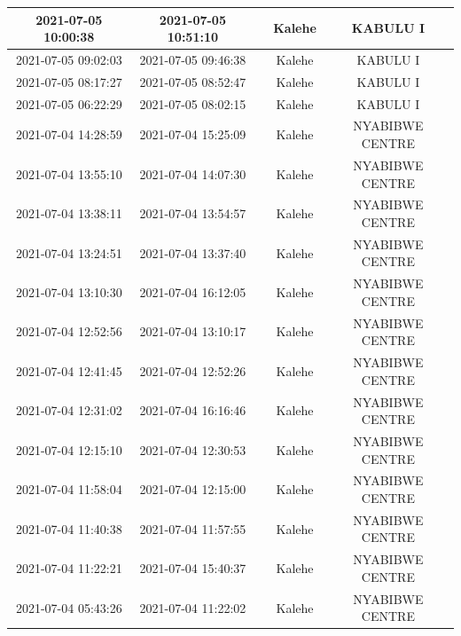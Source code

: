 \documentclass[
]{book}
\begin{document}
\begin{table}
\begin{tabular}[t]{c|c|>{}c|c|c}
\hline
2021-07-05 10:00:38 & 2021-07-05 10:51:10 & \cellcolor[HTML]{3C508B}{\textcolor{white}{51}} & Kalehe & KABULU I\\
\hline
2021-07-05 09:02:03 & 2021-07-05 09:46:38 & \cellcolor[HTML]{43BF71}{\textcolor{white}{45}} & Kalehe & KABULU I\\
\hline
2021-07-05 08:17:27 & 2021-07-05 08:52:47 & \cellcolor[HTML]{306B8E}{\textcolor{white}{35}} & Kalehe & KABULU I\\
\hline
2021-07-05 06:22:29 & 2021-07-05 08:02:15 & \cellcolor[HTML]{3A558C}{\textcolor{white}{100}} & Kalehe & KABULU I\\
\hline
2021-07-04 14:28:59 & 2021-07-04 15:25:09 & \cellcolor[HTML]{3BBB75}{\textcolor{white}{56}} & Kalehe & NYABIBWE CENTRE\\
\hline
2021-07-04 13:55:10 & 2021-07-04 14:07:30 & \cellcolor[HTML]{481F70}{\textcolor{white}{12}} & Kalehe & NYABIBWE CENTRE\\
\hline
2021-07-04 13:38:11 & 2021-07-04 13:54:57 & \cellcolor[HTML]{355E8D}{\textcolor{white}{17}} & Kalehe & NYABIBWE CENTRE\\
\hline
2021-07-04 13:24:51 & 2021-07-04 13:37:40 & \cellcolor[HTML]{3C508B}{\textcolor{white}{13}} & Kalehe & NYABIBWE CENTRE\\
\hline
2021-07-04 13:10:30 & 2021-07-04 16:12:05 & \cellcolor[HTML]{440154}{\textcolor{white}{182}} & Kalehe & NYABIBWE CENTRE\\
\hline
2021-07-04 12:52:56 & 2021-07-04 13:10:17 & \cellcolor[HTML]{1E9D89}{\textcolor{white}{17}} & Kalehe & NYABIBWE CENTRE\\
\hline
2021-07-04 12:41:45 & 2021-07-04 12:52:26 & \cellcolor[HTML]{306B8E}{\textcolor{white}{11}} & Kalehe & NYABIBWE CENTRE\\
\hline
2021-07-04 12:31:02 & 2021-07-04 16:16:46 & \cellcolor[HTML]{355E8D}{\textcolor{white}{226}} & Kalehe & NYABIBWE CENTRE\\
\hline
2021-07-04 12:15:10 & 2021-07-04 12:30:53 & \cellcolor[HTML]{277E8E}{\textcolor{white}{16}} & Kalehe & NYABIBWE CENTRE\\
\hline
2021-07-04 11:58:04 & 2021-07-04 12:15:00 & \cellcolor[HTML]{297A8E}{\textcolor{white}{17}} & Kalehe & NYABIBWE CENTRE\\
\hline
2021-07-04 11:40:38 & 2021-07-04 11:57:55 & \cellcolor[HTML]{3E4C8A}{\textcolor{white}{17}} & Kalehe & NYABIBWE CENTRE\\
\hline
2021-07-04 11:22:21 & 2021-07-04 15:40:37 & \cellcolor[HTML]{375A8C}{\textcolor{white}{258}} & Kalehe & NYABIBWE CENTRE\\
\hline
2021-07-04 05:43:26 & 2021-07-04 11:22:02 & \cellcolor[HTML]{306B8E}{\textcolor{white}{339}} & Kalehe & NYABIBWE CENTRE\\
\hline
\end{tabular}
\end{table}
\end{document}
